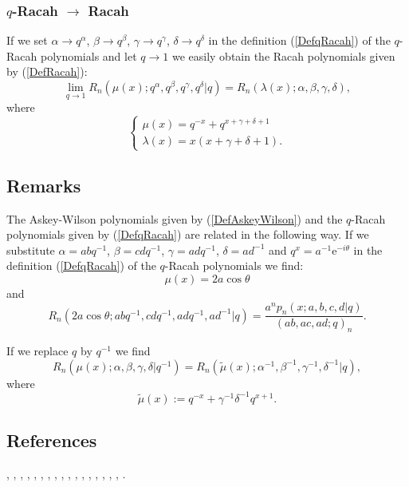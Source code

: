 \documentclass[envcountchap,graybox]{svmono}
\newcommand{\e}{\textrm{e}}
\begin{document}
\subsubsection*{$q$-Racah $\rightarrow$ Racah}
If we set $\alpha\rightarrow q^{\alpha}$, $\beta\rightarrow q^{\beta}$, $\gamma\rightarrow q^{\gamma}$,
$\delta\rightarrow q^{\delta}$ in the definition (\ref{DefqRacah}) of the $q$-Racah polynomials
and let $q\rightarrow 1$ we easily obtain the Racah polynomials given by (\ref{DefRacah}):
\begin{equation}
\lim_{q\rightarrow 1}R_n(\mu(x);q^{\alpha},q^{\beta},q^{\gamma},q^{\delta}|q)
=R_n(\lambda(x);\alpha,\beta,\gamma,\delta),
\end{equation}
where
$$\left\{\begin{array}{l}
\displaystyle\mu(x)=q^{-x}+q^{x+\gamma+\delta+1}\\[5mm]
\displaystyle\lambda(x)=x(x+\gamma+\delta+1).
\end{array}\right.$$

\subsection*{Remarks}
The Askey-Wilson polynomials given by (\ref{DefAskeyWilson}) and the $q$-Racah
polynomials given by (\ref{DefqRacah}) are related in the following way.
If we substitute $\alpha=abq^{-1}$, $\beta=cdq^{-1}$, $\gamma=adq^{-1}$,
$\delta=ad^{-1}$ and $q^x=a^{-1}\e^{-i\theta}$ in the definition
(\ref{DefqRacah}) of the $q$-Racah polynomials we find:
$$\mu(x)=2a\cos\theta$$
and
$$R_n(2a\cos\theta;abq^{-1},cdq^{-1},adq^{-1},ad^{-1}|q)
=\frac{a^np_n(x;a,b,c,d|q)}{(ab,ac,ad;q)_n}.$$

\noindent
If we replace $q$ by $q^{-1}$ we find
$$R_n(\mu(x);\alpha,\beta,\gamma,\delta|q^{-1})=R_n({\tilde\mu}(x);\alpha^{-1},\beta^{-1},\gamma^{-1},\delta^{-1}|q),$$
where
$${\tilde\mu}(x):=q^{-x}+\gamma^{-1}\delta^{-1}q^{x+1}.$$

\subsection*{References}
\cite{AlSalam90}, \cite{AlSalamVerma82II}, \cite{AndrewsAskey85},
\cite{AskeyWilson79}, \cite{AskeyWilson85}, \cite{AtakRahmanSuslov},
\cite{LChihara87}, \cite{LChihara93}, \cite{Fischer94},
\cite{GasperRahman83I}, \cite{GasperRahman84}, \cite{GasperRahman90},
\cite{Ismail86I}, \cite{Jain92}, \cite{Koorn90II}, \cite{Nikiforov+},
\cite{Perlstadt}, \cite{Rahman82}.
\end{document}
